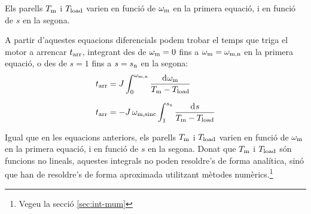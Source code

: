 Els parells $T_\mathrm{m}$ i $T_\mathrm{load}$ varien en funció de $\omega_\mathrm{m}$ en la primera equació, i en funció de $s$ en la segona.

A partir d'aquestes equacions diferencials podem trobar el temps que triga el motor a arrencar $t_\mathrm{arr}$, integrant des de $\omega_\mathrm{m}=0$ fins a $\omega_\mathrm{m}=\omega_\mathrm{m,n}$ en la primera equació, o des de $s = 1$ fins a $s = s_\mathrm{n}$ en la segona:
\begin{subequations}
\begin{align}
    t\ped{arr} &= J\int_{0}^{\omega\ped{m,n}} \frac{\diff\omega\ped{m}}{T\ped{m}-T\ped{load}}\label{eq:tarr-mot}\\[1.5ex]
    t\ped{arr} &= - J\,\omega\ped{m,sinc} \int_{1}^{s\ped{n}} \frac{\diff s}{T\ped{m}-T\ped{load}}
\end{align}
\end{subequations}

Igual que en les equacions anteriors, els parells $T_\mathrm{m}$ i $T_\mathrm{load}$ varien en funció de $\omega_\mathrm{m}$ en la primera equació, i en funció de $s$ en la segona. Donat que $T_\mathrm{m}$ i $T_\mathrm{load}$ són funcions no lineals, aquestes integrals no poden resoldre's de forma analítica, sinó que han de resoldre's de forma aproximada utilitzant mètodes numèrics.\footnote{Vegeu la secció \ref{sec:int-mum}}


